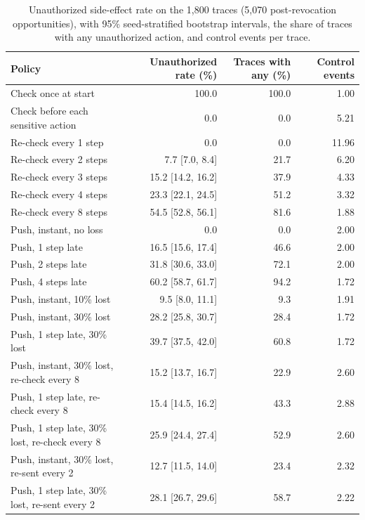 \documentclass[11pt,a4paper]{article}
\begin{document}
\begin{table}[t]
\centering
\small
\caption{Unauthorized side-effect rate on the 1,800 traces (5,070 post-revocation opportunities), with 95\%
seed-stratified bootstrap intervals, the share of traces with any unauthorized action, and control events per
trace.}
\label{tab:sim}
\begin{tabular}{lrrr}
\toprule
Policy & Unauthorized rate (\%) & Traces with any (\%) & Control events \\
\midrule
Check once at start & 100.0 & 100.0 & 1.00 \\
Check before each sensitive action & 0.0 & 0.0 & 5.21 \\
\addlinespace
Re-check every 1 step & 0.0 & 0.0 & 11.96 \\
Re-check every 2 steps & 7.7 [7.0, 8.4] & 21.7 & 6.20 \\
Re-check every 3 steps & 15.2 [14.2, 16.2] & 37.9 & 4.33 \\
Re-check every 4 steps & 23.3 [22.1, 24.5] & 51.2 & 3.32 \\
Re-check every 8 steps & 54.5 [52.8, 56.1] & 81.6 & 1.88 \\
\addlinespace
Push, instant, no loss & 0.0 & 0.0 & 2.00 \\
Push, 1 step late & 16.5 [15.6, 17.4] & 46.6 & 2.00 \\
Push, 2 steps late & 31.8 [30.6, 33.0] & 72.1 & 2.00 \\
Push, 4 steps late & 60.2 [58.7, 61.7] & 94.2 & 1.72 \\
Push, instant, 10\% lost & 9.5 [8.0, 11.1] & 9.3 & 1.91 \\
Push, instant, 30\% lost & 28.2 [25.8, 30.7] & 28.4 & 1.72 \\
Push, 1 step late, 30\% lost & 39.7 [37.5, 42.0] & 60.8 & 1.72 \\
\addlinespace
Push, instant, 30\% lost, re-check every 8 & 15.2 [13.7, 16.7] & 22.9 & 2.60 \\
Push, 1 step late, re-check every 8 & 15.4 [14.5, 16.2] & 43.3 & 2.88 \\
Push, 1 step late, 30\% lost, re-check every 8 & 25.9 [24.4, 27.4] & 52.9 & 2.60 \\
Push, instant, 30\% lost, re-sent every 2 & 12.7 [11.5, 14.0] & 23.4 & 2.32 \\
Push, 1 step late, 30\% lost, re-sent every 2 & 28.1 [26.7, 29.6] & 58.7 & 2.22 \\
\bottomrule
\end{tabular}
\end{table}
\end{document}
